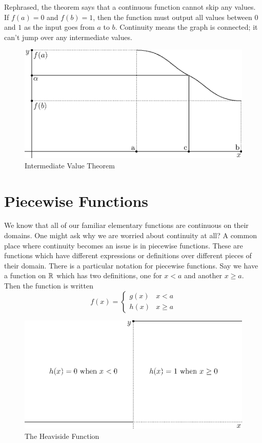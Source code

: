 \documentclass[fleqn]{report}
\begin{document}
Rephrased, the theorem says that a continuous function cannot
skip any values. If $f(a) = 0$ and $f(b) = 1$, then the
function must output all values between $0$ and $1$ as the
input goes from $a$ to $b$. Continuity means the graph is
connected; it can't jump over any intermediate values.

\begin{figure}[t]
\centering
\includegraphics[width=12cm]{figure46.eps}
\caption{Intermediate Value Theorem}
\label{Intermediate Value Theorem}
\end{figure}

\section*{Piecewise Functions}

We know that all of our familiar elementary functions are
continuous on their domains. One might ask why we are worried
about continuity at all? A common place where continuity
becomes an issue is in piecewise functions. These are
functions which have different expressions or definitions over
different pieces of their domain. There is a particular
notation for piecewise functions. Say we have a function on
$\mathbb{R}$ which has two definitions, one for $x<a$ and another $x
\geq a$. Then the function is written
\begin{equation*}
f(x) = \left\{ \begin{matrix} g(x) & x < a \\ h(x) & x \geq a
\end{matrix} \right.
\end{equation*}

\begin{figure}[ht]
\centering
\includegraphics[width=12cm]{figure21.eps}
\caption{The Heaviside Function}
\label{The Heaviside Function}
\end{figure}
\end{document}
